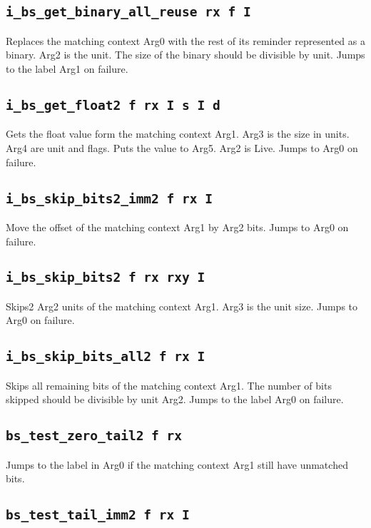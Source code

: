\documentclass{article}
\newcommand{\iop}[1]{\texttt{#1}}
\begin{document}
\subsection*{\iop{i\_bs\_get\_binary\_all\_reuse rx f I}}

Replaces the matching context Arg0 with the rest of its reminder represented as
a binary. Arg2 is the unit. The size of the binary should be divisible by unit.
Jumps to the label Arg1 on failure.

\subsection*{\iop{i\_bs\_get\_float2 f rx I s I d}}

Gets the float value form the matching context Arg1. Arg3 is the size in units.
Arg4 are unit and flags. Puts the value to Arg5. Arg2 is Live. Jumps to Arg0 on
failure.

\subsection*{\iop{i\_bs\_skip\_bits2\_imm2 f rx I}}

Move the offset of the matching context Arg1 by Arg2 bits. Jumps to Arg0 on
failure.

\subsection*{\iop{i\_bs\_skip\_bits2 f rx rxy I}}

Skips2 Arg2 units of the matching context Arg1. Arg3 is the unit size. Jumps to
Arg0 on failure.

\subsection*{\iop{i\_bs\_skip\_bits\_all2 f rx I}}

Skips all remaining bits of the matching context Arg1. The number of bits
skipped should be divisible by unit Arg2. Jumps to the label Arg0 on failure.

\subsection*{\iop{bs\_test\_zero\_tail2 f rx}}

Jumps to the label in Arg0 if the matching context Arg1 still have unmatched
bits.

\subsection*{\iop{bs\_test\_tail\_imm2 f rx I}}
\end{document}

